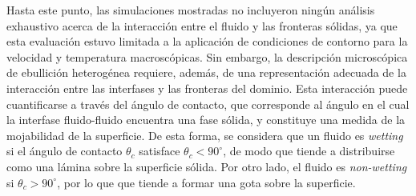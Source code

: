Hasta este punto, las simulaciones mostradas no incluyeron ning\'un an\'alisis exhaustivo acerca de la interacci\'on entre el fluido y las fronteras s\'olidas, ya que esta evaluaci\'on estuvo limitada a la aplicaci\'on de condiciones de contorno para la velocidad y temperatura macrosc\'opicas. Sin embargo, la descripci\'on microsc\'opica de ebullici\'on heterog\'enea requiere, adem\'as, de una representaci\'on adecuada de la interacci\'on entre las interfases y las fronteras del dominio. Esta interacci\'on puede cuantificarse a trav\'es del \'angulo de contacto, que corresponde al \'angulo en el cual la interfase fluido-fluido encuentra una fase s\'olida, y constituye una medida de la mojabilidad de la superficie. De esta forma, se considera que un fluido es \emph{wetting} si el \'angulo de contacto $\theta_c$ satisface $\theta_c < 90^{\circ}$, de modo que tiende a distribuirse como una l\'amina sobre la superficie s\'olida. Por otro lado, el fluido es \emph{non-wetting} si $\theta_c > 90^{\circ}$, por lo que que tiende a formar una gota sobre la superficie.

